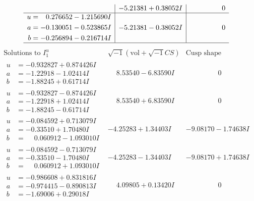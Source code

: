 \documentclass[1p]{elsarticle_modified}
\theoremstyle{definition}
\newcommand{\I}{\sqrt{-1}}
\begin{document}
$$\begin{array}{c|c|c}
 & -5.21381 + 0.38052 I & \phantom{-0.000000 } 0 \\ \hline\begin{aligned}
u &= \phantom{-}0.276652 - 1.215690 I \\
a &= -0.130051 - 0.523865 I \\
b &= -0.256894 - 0.216714 I\end{aligned}
 & -5.21381 - 0.38052 I & \phantom{-0.000000 } 0\\
 \hline 
 \end{array}$$\newpage$$\begin{array}{c|c|c}  
\text{Solutions to }I^u_{1}& \I (\text{vol} + \sqrt{-1}CS) & \text{Cusp shape}\\
 \hline 
\begin{aligned}
u &= -0.932827 + 0.874426 I \\
a &= -1.22918 - 1.02414 I \\
b &= -1.88245 + 0.61714 I\end{aligned}
 & \phantom{-}8.53540 - 6.83590 I & \phantom{-0.000000 } 0 \\ \hline\begin{aligned}
u &= -0.932827 - 0.874426 I \\
a &= -1.22918 + 1.02414 I \\
b &= -1.88245 - 0.61714 I\end{aligned}
 & \phantom{-}8.53540 + 6.83590 I & \phantom{-0.000000 } 0 \\ \hline\begin{aligned}
u &= -0.084592 + 0.713079 I \\
a &= -0.33510 + 1.70480 I \\
b &= \phantom{-}0.060912 - 1.093010 I\end{aligned}
 & -4.25283 + 1.34403 I & -9.08170 - 1.74638 I \\ \hline\begin{aligned}
u &= -0.084592 - 0.713079 I \\
a &= -0.33510 - 1.70480 I \\
b &= \phantom{-}0.060912 + 1.093010 I\end{aligned}
 & -4.25283 - 1.34403 I & -9.08170 + 1.74638 I \\ \hline\begin{aligned}
u &= -0.986608 + 0.831816 I \\
a &= -0.974415 - 0.890813 I \\
b &= -1.69006 + 0.29018 I\end{aligned}
 & \phantom{-}4.09805 + 0.13420 I & \phantom{-0.000000 } 0 \\ \hline\begin{aligned}

\end{aligned}
\end{array}$$
\end{document}
